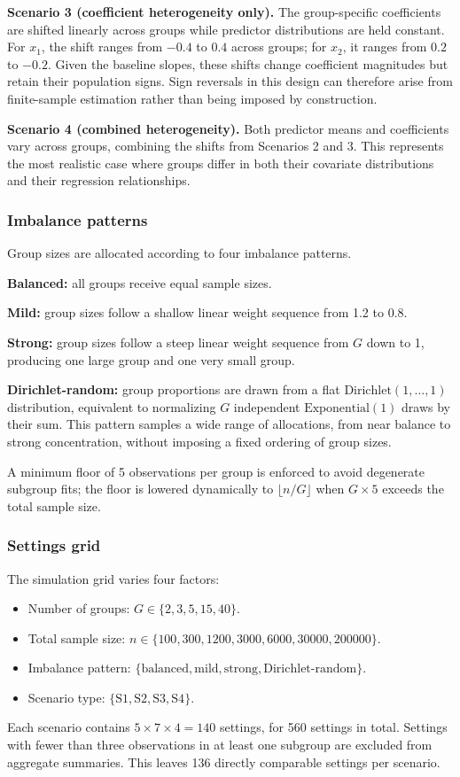 \textbf{Scenario 3 (coefficient heterogeneity only).} The group-specific coefficients are shifted linearly across groups while predictor distributions are held constant. For $x_1$, the shift ranges from $-0.4$ to $0.4$ across groups; for $x_2$, it ranges from $0.2$ to $-0.2$. Given the baseline slopes, these shifts change coefficient magnitudes but retain their population signs. Sign reversals in this design can therefore arise from finite-sample estimation rather than being imposed by construction.

\textbf{Scenario 4 (combined heterogeneity).} Both predictor means and coefficients vary across groups, combining the shifts from Scenarios 2 and 3. This represents the most realistic case where groups differ in both their covariate distributions and their regression relationships.

\subsubsection{Imbalance patterns}

Group sizes are allocated according to four imbalance patterns.

\textbf{Balanced:} all groups receive equal sample sizes.

\textbf{Mild:} group sizes follow a shallow linear weight sequence from 1.2 to 0.8.

\textbf{Strong:} group sizes follow a steep linear weight sequence from $G$ down to 1, producing one large group and one very small group.

\textbf{Dirichlet-random:} group proportions are drawn from a flat $\text{Dirichlet}(1,\dots,1)$ distribution, equivalent to normalizing $G$ independent $\text{Exponential}(1)$ draws by their sum. This pattern samples a wide range of allocations, from near balance to strong concentration, without imposing a fixed ordering of group sizes.

A minimum floor of 5 observations per group is enforced to avoid degenerate subgroup fits; the floor is lowered dynamically to $\lfloor n/G \rfloor$ when $G \times 5$ exceeds the total sample size.

\subsubsection{Settings grid}

The simulation grid varies four factors:
\begin{itemize}
  \item Number of groups: $G \in \{2, 3, 5, 15, 40\}$.
  \item Total sample size: $n \in \{100, 300, 1200, 3000, 6000, 30000, 200000\}$.
  \item Imbalance pattern: $\{\text{balanced},\text{mild},\text{strong},\text{Dirichlet-random}\}$.
  \item Scenario type: $\{\text{S1},\text{S2},\text{S3},\text{S4}\}$.
\end{itemize}
Each scenario contains $5 \times 7 \times 4 = 140$ settings, for 560 settings in total. Settings with fewer than three observations in at least one subgroup are excluded from aggregate summaries. This leaves 136 directly comparable settings per scenario.

